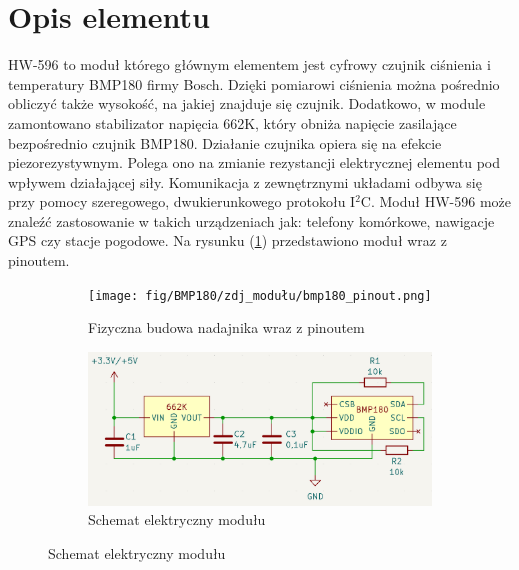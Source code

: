 \documentclass[11pt, a4paper]{article}
\author{Jakub Grzesiak}
\begin{document}
%
%
\newpage

\section*{Opis elementu}
HW-596 to moduł którego głównym elementem jest cyfrowy czujnik ciśnienia i temperatury BMP180 firmy Bosch. Dzięki pomiarowi ciśnienia można pośrednio obliczyć także wysokość, na jakiej znajduje się czujnik. Dodatkowo, w module zamontowano stabilizator napięcia 662K, który obniża napięcie zasilające bezpośrednio czujnik BMP180. Działanie czujnika opiera się na efekcie piezorezystywnym. Polega ono na zmianie rezystancji elektrycznej elementu pod wpływem działającej siły. Komunikacja z zewnętrznymi układami odbywa się przy pomocy szeregowego, dwukierunkowego protokołu I$^2$C.
Moduł HW-596 może znaleźć zastosowanie w takich urządzeniach jak: telefony komórkowe, nawigacje GPS czy stacje pogodowe.
Na rysunku (\ref{fig:_bmp180_pinout}) przedstawiono moduł wraz z pinoutem.

\vspace{0.25cm}
\begin{figure}[h]
\centering
\begin{subfigure}{.5\textwidth}
\centering
\texttt{[image: fig/BMP180/zdj\_modułu/bmp180\_pinout.png]}
\caption{Fizyczna budowa nadajnika wraz z pinoutem}
\label{fig:_bmp180_pinout}
\end{subfigure}%
\begin{subfigure}{.5\textwidth}
\centering
\includegraphics[width=1\linewidth]{fig/BMP180/polaczenie_modulu/schematic.png}
\caption{Schemat elektryczny modułu}
\label{fig:_schematic}
\end{subfigure}
\label{fig:element}
\end{figure}
\vspace{0.25cm}
\end{document}

